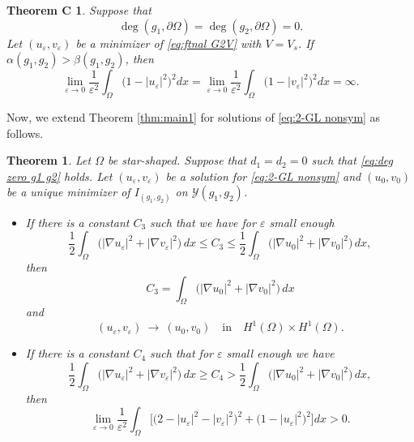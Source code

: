 \documentclass[a4paper,10pt,reqno]{amsart}
\newtheorem{theorem}{Theorem}[section]
\newtheorem*{thmc}{Theorem C}
\theoremstyle{definition}
\newcommand{\calY}{{\mathcal Y}}
\newcommand{\al}{{\alpha}}
\newcommand{\ve}{{\varepsilon}}
\newcommand{\Om}{{\Omega}}
\newcommand{\pa}{\partial}
\newcommand{\qin}{{\quad \mbox{in} \quad}}
\numberwithin{equation}{section}
\begin{document}
\smallskip
\begin{thmc}\cite[Theorem 1.3 (iii)]{HHS23ANONA}
Suppose that
\begin{equation}\label{eq:deg zero g1 g2}
\deg (g_1,\pa \Om)= \deg (g_2,\pa \Om)=0.
\end{equation}
Let $(u_\ve,v_\ve)$ be a minimizer of \eqref{eq:ftnal G2V} with $V=V_s$.
If $\al(g_1,g_2)>\beta(g_1,g_2)$, then
\[ \lim_{\ve \to 0} \frac{1}{\ve^2} \int_\Om \big( 1- |u_\ve|^2 \big)^2 dx = \lim_{\ve \to 0} \frac{1}{\ve^2} \int_\Om \big( 1- |v_\ve|^2 \big)^2 dx =\infty.
\]
\end{thmc}
\medskip

Now, we extend Theorem \ref{thm:main1} for solutions of  \eqref{eq:2-GL nonsym} as follows.

\medskip
\begin{theorem}\label{thm:main3}
Let $\Om$ be star-shaped.
Suppose that $d_1=d_2=0$ such that  \eqref{eq:deg zero g1 g2} holds.
Let  $(u_\ve,v_\ve)$ be a solution for \eqref{eq:2-GL nonsym} and $(u_0,v_0)$ be a unique minimizer of $I_{(g_1,g_2)}$ on $\calY(g_1,g_2)$.
\begin {itemize}
\item[{\rm (i)}]
If  there is a constant $C_3$  such that  we have for $\ve$ small enough
\begin{equation}\label{G < C_1-sys-nonsym}
\frac{1}{2} \int_\Omega \big( |\nabla u_\ve|^2 + |\nabla v_\ve|^2 \big)\, dx \leq C_3 \leq
\frac{1}{2} \int_\Omega \big( |\nabla u_0|^2 + |\nabla v_0|^2 \big)\, dx ,
\end{equation}
then
\begin{equation}\label{eq:C1-1-sys-nonsym}
C_3 = \int_\Omega \big( |\nabla u_0|^2 + |\nabla v_0|^2 \big)\, dx
\end{equation}
and
\[  (u_\ve,v_\ve)  ~\to ~  ( u_0,v_0) \qin  H^1(\Om)\times H^1(\Om).
\]


\item[{\rm (ii)}]
If  there is a constant $C_4$  such that for $\ve$ small enough we have
\begin{equation}\label{G bdd by C1-C2-sys-nonsym}
 \frac12 \int_\Om \big( |\nabla u_\ve|^2 + |\nabla v_\ve|^2 \big)\, dx \geq C_4 >   \frac12 \int_\Om \big( |\nabla u_0|^2 +  |\nabla v_0|^2 \big) \, dx,
\end{equation}
then
\begin{equation}\label{eq:potential zero nonsym}
\lim_{\ve \to 0} \frac{1}{\ve^2}  \int_\Om  \Big[ \big( 2- |u_\ve|^2 - |v_\ve|^2 \big)^2 +    \big( 1- |u_\ve|^2   \big)^2 \Big] dx > 0.
\end{equation}
\end{itemize}
\end{theorem}
\bigskip
\end{document}
